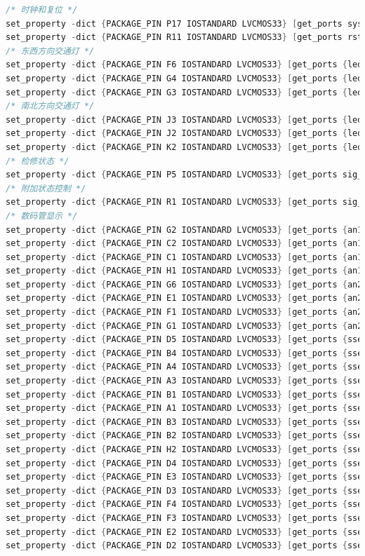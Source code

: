 \documentclass{article}
\begin{document}
\begin{lstlisting}[language=Verilog, caption={交通灯控制约束文件}]
/* 时钟和复位 */
set_property -dict {PACKAGE_PIN P17 IOSTANDARD LVCMOS33} [get_ports sys_clk]
set_property -dict {PACKAGE_PIN R11 IOSTANDARD LVCMOS33} [get_ports rst]
/* 东西方向交通灯 */
set_property -dict {PACKAGE_PIN F6 IOSTANDARD LVCMOS33} [get_ports {led_east_west[2]}]
set_property -dict {PACKAGE_PIN G4 IOSTANDARD LVCMOS33} [get_ports {led_east_west[1]}]
set_property -dict {PACKAGE_PIN G3 IOSTANDARD LVCMOS33} [get_ports {led_east_west[0]}]
/* 南北方向交通灯 */
set_property -dict {PACKAGE_PIN J3 IOSTANDARD LVCMOS33} [get_ports {led_north_south[2]}]
set_property -dict {PACKAGE_PIN J2 IOSTANDARD LVCMOS33} [get_ports {led_north_south[1]}]
set_property -dict {PACKAGE_PIN K2 IOSTANDARD LVCMOS33} [get_ports {led_north_south[0]}]
/* 检修状态 */
set_property -dict {PACKAGE_PIN P5 IOSTANDARD LVCMOS33} [get_ports sig_repair]
/* 附加状态控制 */
set_property -dict {PACKAGE_PIN R1 IOSTANDARD LVCMOS33} [get_ports sig_break]
/* 数码管显示 */
set_property -dict {PACKAGE_PIN G2 IOSTANDARD LVCMOS33} [get_ports {an1[0]}]
set_property -dict {PACKAGE_PIN C2 IOSTANDARD LVCMOS33} [get_ports {an1[1]}]
set_property -dict {PACKAGE_PIN C1 IOSTANDARD LVCMOS33} [get_ports {an1[2]}]
set_property -dict {PACKAGE_PIN H1 IOSTANDARD LVCMOS33} [get_ports {an1[3]}]
set_property -dict {PACKAGE_PIN G6 IOSTANDARD LVCMOS33} [get_ports {an2[3]}]
set_property -dict {PACKAGE_PIN E1 IOSTANDARD LVCMOS33} [get_ports {an2[2]}]
set_property -dict {PACKAGE_PIN F1 IOSTANDARD LVCMOS33} [get_ports {an2[1]}]
set_property -dict {PACKAGE_PIN G1 IOSTANDARD LVCMOS33} [get_ports {an2[0]}]
set_property -dict {PACKAGE_PIN D5 IOSTANDARD LVCMOS33} [get_ports {sseg1[7]}]
set_property -dict {PACKAGE_PIN B4 IOSTANDARD LVCMOS33} [get_ports {sseg1[6]}]
set_property -dict {PACKAGE_PIN A4 IOSTANDARD LVCMOS33} [get_ports {sseg1[5]}]
set_property -dict {PACKAGE_PIN A3 IOSTANDARD LVCMOS33} [get_ports {sseg1[4]}]
set_property -dict {PACKAGE_PIN B1 IOSTANDARD LVCMOS33} [get_ports {sseg1[3]}]
set_property -dict {PACKAGE_PIN A1 IOSTANDARD LVCMOS33} [get_ports {sseg1[2]}]
set_property -dict {PACKAGE_PIN B3 IOSTANDARD LVCMOS33} [get_ports {sseg1[1]}]
set_property -dict {PACKAGE_PIN B2 IOSTANDARD LVCMOS33} [get_ports {sseg1[0]}]
set_property -dict {PACKAGE_PIN H2 IOSTANDARD LVCMOS33} [get_ports {sseg2[7]}]
set_property -dict {PACKAGE_PIN D4 IOSTANDARD LVCMOS33} [get_ports {sseg2[6]}]
set_property -dict {PACKAGE_PIN E3 IOSTANDARD LVCMOS33} [get_ports {sseg2[5]}]
set_property -dict {PACKAGE_PIN D3 IOSTANDARD LVCMOS33} [get_ports {sseg2[4]}]
set_property -dict {PACKAGE_PIN F4 IOSTANDARD LVCMOS33} [get_ports {sseg2[3]}]
set_property -dict {PACKAGE_PIN F3 IOSTANDARD LVCMOS33} [get_ports {sseg2[2]}]
set_property -dict {PACKAGE_PIN E2 IOSTANDARD LVCMOS33} [get_ports {sseg2[1]}]
set_property -dict {PACKAGE_PIN D2 IOSTANDARD LVCMOS33} [get_ports {sseg2[0]}]
\end{lstlisting}
\end{document}
